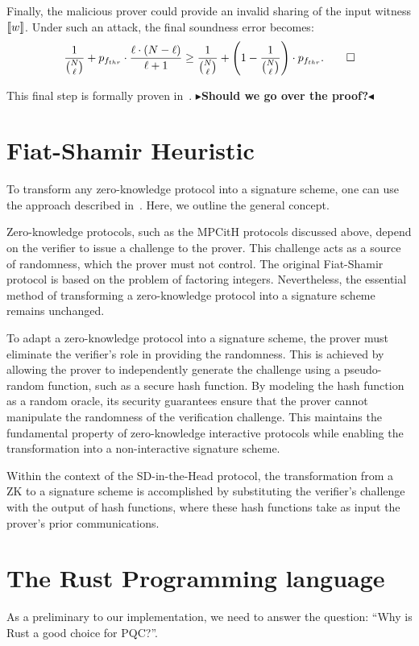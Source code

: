 \documentclass[11pt]{report}
\theoremstyle{definition}
\theoremstyle{plain}
\newcommand{\todo}[1]{{\color[rgb]{.5,0,0}\textbf{$\blacktriangleright$#1$\blacktriangleleft$}}}
\begin{document}
Finally, the malicious prover could provide an invalid sharing of the input witness $ \llbracket w \rrbracket $. Under such an attack, the final soundness error becomes:
\begin{align*}
  \frac{1}{\binom{N}{\ell}} + p_{f_{thr}} \cdot \frac{\ell \cdot (N - \ell)}{\ell + 1} \geq \frac{1}{\binom{N}{\ell}} + \left(1 - \frac{1}{\binom{N}{\ell}}\right) \cdot p_{f_{thr}}. \qed
\end{align*}

This final step is formally proven in~\cite[p20]{feneuil2023threshold}.
\todo{Should we go over the proof?}

\section{Fiat-Shamir Heuristic}\label{sec:fiatshamir}
To transform any zero-knowledge protocol into a signature scheme, one can use the approach described in~\cite{fiat1986prove}. Here, we outline the general concept.

Zero-knowledge protocols, such as the MPCitH protocols discussed above, depend on the verifier to issue a challenge to the prover. This challenge acts as a source of randomness, which the prover must not control. The original Fiat-Shamir protocol is based on the problem of factoring integers. Nevertheless, the essential method of transforming a zero-knowledge protocol into a signature scheme remains unchanged.

To adapt a zero-knowledge protocol into a signature scheme, the prover must eliminate the verifier's role in providing the randomness. This is achieved by allowing the prover to independently generate the challenge using a pseudo-random function, such as a secure hash function. By modeling the hash function as a random oracle, its security guarantees ensure that the prover cannot manipulate the randomness of the verification challenge. This maintains the fundamental property of zero-knowledge interactive protocols while enabling the transformation into a non-interactive signature scheme.

Within the context of the SD-in-the-Head protocol, the transformation from a ZK to a signature scheme is accomplished by substituting the verifier's challenge with the output of hash functions, where these hash functions take as input the prover's prior communications.

\section{The Rust Programming language}\label{sec:rust}
As a preliminary to our implementation, we need to answer the question: ``Why is Rust a good choice for PQC?''.
\end{document}
